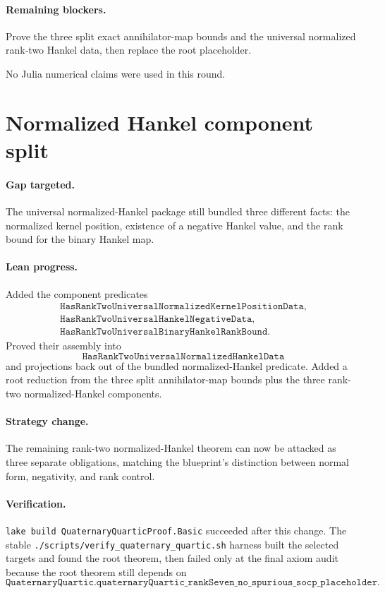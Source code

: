 \documentclass[11pt]{article}
\begin{document}
\paragraph{Remaining blockers.}
Prove the three split exact annihilator-map bounds and the universal normalized
rank-two Hankel data, then replace the root placeholder.

No Julia numerical claims were used in this round.

\section*{Normalized Hankel component split}

\paragraph{Gap targeted.}
The universal normalized-Hankel package still bundled three different facts:
the normalized kernel position, existence of a negative Hankel value, and the
rank bound for the binary Hankel map.

\paragraph{Lean progress.}
Added the component predicates
\[
\begin{gathered}
\texttt{HasRankTwoUniversalNormalizedKernelPositionData},\\
\texttt{HasRankTwoUniversalHankelNegativeData},\\
\texttt{HasRankTwoUniversalBinaryHankelRankBound}.
\end{gathered}
\]
Proved their assembly into
\[
\texttt{HasRankTwoUniversalNormalizedHankelData}
\]
and projections back out of the bundled normalized-Hankel predicate.  Added a
root reduction from the three split annihilator-map bounds plus the three
rank-two normalized-Hankel components.

\paragraph{Strategy change.}
The remaining rank-two normalized-Hankel theorem can now be attacked as three
separate obligations, matching the blueprint's distinction between normal
form, negativity, and rank control.

\paragraph{Verification.}
\texttt{lake build QuaternaryQuarticProof.Basic} succeeded after this change.
The stable \texttt{./scripts/verify\_quaternary\_quartic.sh} harness built the
selected targets and found the root theorem, then failed only at the final axiom
audit because the root theorem still depends on
\[
\texttt{QuaternaryQuartic.quaternaryQuartic\_rankSeven\_no\_spurious\_socp\_placeholder}.
\]
\end{document}
